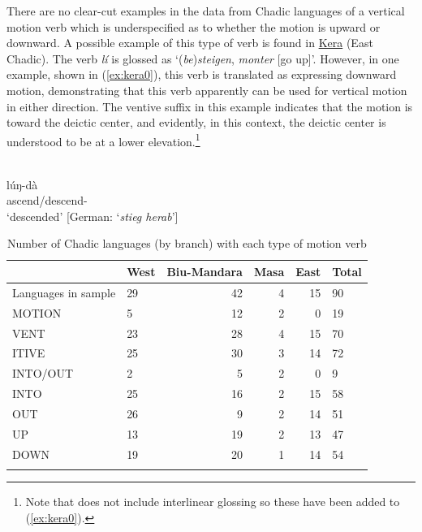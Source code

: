 There are no clear-cut examples in the data from Chadic languages of a vertical motion verb which is underspecified as to whether the motion is upward or downward. A possible example of this type of verb is found in \hyperref[kera]{Kera} (East Chadic). The verb  \textit{lí} is glossed as `(\textit{be})\textit{steigen}, \textit{monter} [go up]'. However, in one example, shown in (\ref{ex:kera0}), this verb is translated as expressing downward motion, demonstrating that this verb apparently can be used for vertical motion in either direction. The ventive suffix in this example indicates that the motion is toward the deictic center, and evidently, in this context, the deictic center is understood to be at a lower elevation.\footnote{Note that \citet{ebertSpracheUndTradition1979} does not include interlinear glossing so these have been added to (\ref{ex:kera0}).} 

\ea\label{ex:kera0}
 \\
\gll lúŋ-dà	\\
ascend/descend-	\\
\glt `descended' [German: `\textit{stieg herab}']
\z 

\begin{table}[t]
 \caption{Number of Chadic languages (by branch) with each type of motion verb}
	\label{tab:verbsbranch}
	\begin{tabularx}{\textwidth}{l Yrrr Y}
		\lsptoprule
{} &  West &  Biu-Mandara &  Masa &  East &  Total \\
\midrule
Languages in sample &    29 &           42 &     4 &    15 &     90 \\
\midrule
MOTION     &     5 &           12 &     2 &     0 &     19 \\
VENT    &    23 &           28 &     4 &    15 &     70 \\
ITIVE      &    25 &           30 &     3 &    14 &     72 \\
INTO/OUT     &     2 &            5 &     2 &     0 &      9 \\
INTO        &    25 &           16 &     2 &    15 &     58 \\
OUT        &    26 &           9 &     2 &    14 &     51 \\
UP         &    13 &           19 &     2 &    13 &     47 \\
DOWN       &    19 &           20 &     1 &    14 &     54 \\
		\lspbottomrule
	\end{tabularx}
\end{table}

